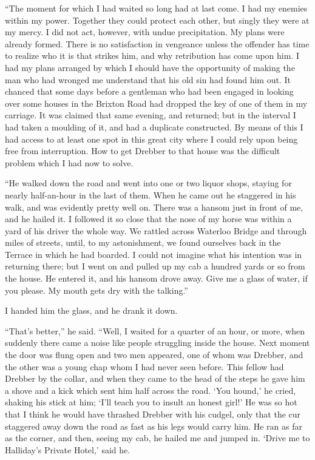 \documentclass[12pt]{book}
\begin{document}
“The moment for which I had waited so long had at last come. I had my enemies within my power. Together they could protect each other, but singly they were at my mercy. I did not act, however, with undue precipitation. My plans were already formed. There is no satisfaction in vengeance unless the offender has time to realize who it is that strikes him, and why retribution has come upon him. I had my plans arranged by which I should have the opportunity of making the man who had wronged me understand that his old sin had found him out. It chanced that some days before a gentleman who had been engaged in looking over some houses in the Brixton Road had dropped the key of one of them in my carriage. It was claimed that same evening, and returned; but in the interval I had taken a moulding of it, and had a duplicate constructed. By means of this I had access to at least one spot in this great city where I could rely upon being free from interruption. How to get Drebber to that house was the difficult problem which I had now to solve. 

“He walked down the road and went into one or two liquor shops, staying for nearly half-an-hour in the last of them. When he came out he staggered in his walk, and was evidently pretty well on. There was a hansom just in front of me, and he hailed it. I followed it so close that the nose of my horse was within a yard of his driver the whole way. We rattled across Waterloo Bridge and through miles of streets, until, to my astonishment, we found ourselves back in the Terrace in which he had boarded. I could not imagine what his intention was in returning there; but I went on and pulled up my cab a hundred yards or so from the house. He entered it, and his hansom drove away. Give me a glass of water, if you please. My mouth gets dry with the talking.” 

I handed him the glass, and he drank it down. 

“That’s better,” he said. “Well, I waited for a quarter of an hour, or more, when suddenly there came a noise like people struggling inside the house. Next moment the door was flung open and two men appeared, one of whom was Drebber, and the other was a young chap whom I had never seen before. This fellow had Drebber by the collar, and when they came to the head of the steps he gave him a shove and a kick which sent him half across the road. ‘You hound,’ he cried, shaking his stick at him; ‘I’ll teach you to insult an honest girl!’ He was so hot that I think he would have thrashed Drebber with his cudgel, only that the cur staggered away down the road as fast as his legs would carry him. He ran as far as the corner, and then, seeing my cab, he hailed me and jumped in. ‘Drive me to Halliday’s Private Hotel,’ said he. 
\end{document}
